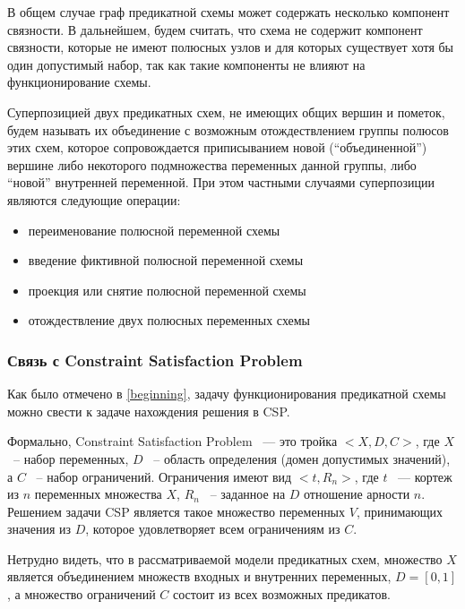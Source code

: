 \documentclass[12pt]{article}
\begin{document}
В общем случае граф предикатной схемы может содержать несколько компонент связности. 
В дальнейшем, будем считать, что схема не содержит компонент связности, 
которые не имеют полюсных узлов и для которых существует хотя бы один допустимый набор, так как такие компоненты не влияют на функционирование схемы.

Суперпозицией двух предикатных схем, не имеющих общих вершин и пометок, 
будем называть их объединение с возможным отождествлением группы полюсов этих схем, 
которое сопровождается приписыванием новой (``объединенной'') вершине либо некоторого подмножества переменных данной группы, либо ``новой'' внутренней переменной.
 При этом частными случаями суперпозиции являются следующие операции:
\begin{itemize}
\item переименование полюсной переменной схемы

\item введение фиктивной полюсной переменной схемы

\item проекция или снятие полюсной переменной схемы

\item отождествление двух полюсных переменных схемы
\end{itemize}

\subsubsection*{Связь с Constraint Satisfaction Problem}
Как было отмечено в \ref{beginning}, задачу функционирования предикатной схемы можно свести к задаче нахождения решения в CSP. 

Формально, Constraint Satisfaction Problem ~--- это тройка $<X,D,C>$, где $X$ ~-- набор переменных, $D$ ~-- область определения (домен допустимых значений), 
а $C$ ~-- набор ограничений. Ограничения имеют вид $<t, R_n>$, где $t$ ~--- кортеж из $n$ переменных множества $X$, 
$R_n$ ~-- заданное на $D$ отношение арности $n$. Решением задачи CSP является такое множество переменных $V$, принимающих значения из $D$, 
которое удовлетворяет всем ограничениям из $C$. 

Нетрудно видеть, что в рассматриваемой модели предикатных схем, множество $X$ является объединением множеств входных и внутренних переменных, $D=[0,1]$,
а множество ограничений $C$ состоит из всех возможных предикатов.
\end{document}
